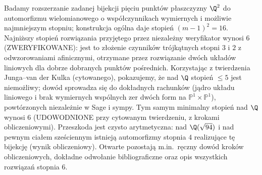 Badamy rozszerzanie zadanej bijekcji pięciu punktów płaszczyzny $\Q^2$ do automorfizmu wielomianowego
o współczynnikach wymiernych i możliwie najmniejszym stopniu; konstrukcja ogólna daje stopień $(m-1)^2=16$.
Najniższy stopień rozwiązania przyjętego przez niezależny weryfikator wynosi $6$ (ZWERYFIKOWANE): jest to
złożenie czynników trójkątnych stopni $3$ i $2$ z odwzorowaniami afinicznymi, otrzymane przez rozwiązanie
dwóch układów liniowych dla dobrze dobranych punktów pośrednich.
Korzystając z twierdzenia Junga--van der Kulka (cytowanego), pokazujemy, że nad $\Q$ stopień $\le5$
jest niemożliwy; dowód sprowadza się do dokładnych rachunków (jądro układu liniowego i brak wymiernych
wspólnych zer dwóch form na $\mathbb{P}^1\times\mathbb{P}^1$), powtórzonych niezależnie w Sage i sympy.
Tym samym minimalny stopień nad $\Q$ wynosi $6$ (UDOWODNIONE przy cytowanym twierdzeniu, z krokami obliczeniowymi).
Przeszkoda jest czysto arytmetyczna: nad $\Q(\sqrt{94})$ i nad pewnym ciałem sześciennym istnieją
automorfizmy stopnia $4$ realizujące tę bijekcję (wynik obliczeniowy).
Otwarte pozostają m.in.\ ręczny dowód kroków obliczeniowych, dokładne odwołanie bibliograficzne
oraz opis wszystkich rozwiązań stopnia $6$.
